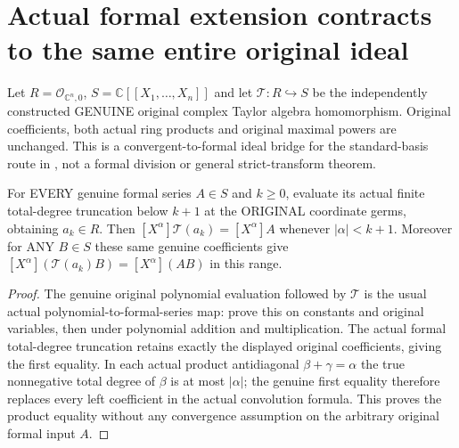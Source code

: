\section{Actual formal extension contracts to the same entire original ideal}

Let $R=\mathcal O_{\mathbb C^n,0}$, $S=\mathbb C[[X_1,\ldots,X_n]]$
and let $\mathcal T:R\hookrightarrow S$ be the independently constructed
GENUINE original complex Taylor algebra homomorphism. Original
coefficients, both actual ring products and original maximal powers are
unchanged. This is a convergent-to-formal ideal bridge for the
standard-basis route in \cite[\S7]{bierstone-milman97-invent-math}, not a
formal division or general strict-transform theorem.

\begin{lemma}
\label{hir:actual-formal-coefficients-original-polynomial-approximation}
\leanok
For EVERY genuine formal series $A\in S$ and $k\ge0$, evaluate its
actual finite total-degree truncation below $k+1$ at the ORIGINAL
coordinate germs, obtaining $a_k\in R$. Then
$[X^\alpha]\mathcal T(a_k)=[X^\alpha]A$ whenever $|\alpha|<k+1$.
Moreover for ANY $B\in S$ these same genuine coefficients give
$[X^\alpha](\mathcal T(a_k)B)=[X^\alpha](AB)$ in this range.
\end{lemma}
\begin{proof}
The genuine original polynomial evaluation followed by $\mathcal T$
is the usual actual polynomial-to-formal-series map: prove this on
constants and original variables, then under polynomial addition and
multiplication. The actual formal total-degree truncation retains
exactly the displayed original coefficients, giving the first equality.
In each actual product antidiagonal $\beta+\gamma=\alpha$ the true
nonnegative total degree of $\beta$ is at most $|\alpha|$; the genuine
first equality therefore replaces every left coefficient in the actual
convolution formula. This proves the product equality without any
convergence assumption on the arbitrary original formal input $A$.
\end{proof}

